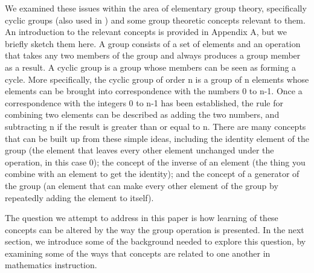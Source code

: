 \documentclass[man,10pt]{apa6}
\begin{document}
We examined these issues within the area of elementary group theory, specifically cyclic groups (also used in ) and some group theoretic concepts relevant to them. An introduction to the relevant concepts is provided in Appendix A, but we briefly sketch them here. A group consists of a set of elements and an operation that takes any two members of the group and always produces a group member as a result. A cyclic group is a group whose members can be seen as forming a cycle. More specifically, the cyclic group of order n is a group of n elements whose elements can be brought into correspondence with the numbers 0 to n-1. Once a correspondence with the integers 0 to n-1 has been established, the rule for combining two elements can be described as adding the two numbers, and subtracting n if the result is greater than or equal to n. There are many concepts that can be built up from these simple ideas, including the identity element of the group (the element that leaves every other element unchanged under the operation, in this case 0); the concept of the inverse of an element (the thing you combine with an element to get the identity); and the concept of a generator of the group (an element that can make every other element of the group by repeatedly adding the element to itself). \par
The question we attempt to address in this paper is how learning of these concepts can be altered by the way the group operation is presented. In the next section, we introduce some of the background needed to explore this question, by examining some of the ways that concepts are related to one another in mathematics instruction.  %
\end{document}
